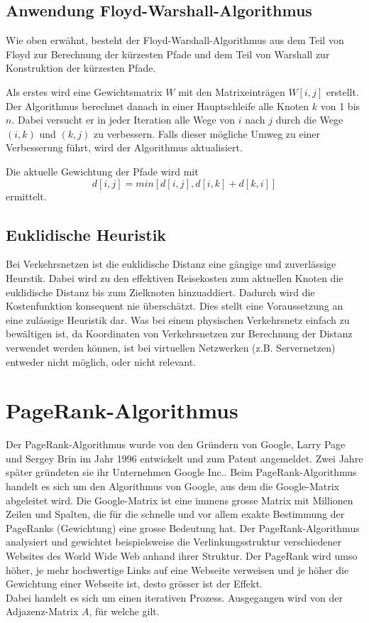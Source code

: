 \subsection{Anwendung Floyd-Warshall-Algorithmus}

Wie oben erwähnt, besteht der Floyd-Warshall-Algorithmus aus dem Teil von Floyd zur Berechnung der kürzesten Pfade und dem Teil von Warshall zur Konstruktion der kürzesten Pfade.

Als erstes wird eine Gewichtsmatrix $W$ mit den Matrixeinträgen $W[i, j]$ erstellt.
Der Algorithmus berechnet danach in einer Hauptschleife alle Knoten $k$ von 1 bis $n$.
Dabei versucht er in jeder Iteration alle Wege von $i$ nach $j$ durch die Wege $(i, k)$ und $(k, j)$ zu verbessern.
Falls dieser mögliche Umweg zu einer Verbesserung führt, wird der Algorithmus aktualisiert.

Die aktuelle Gewichtung der Pfade wird mit
\begin{equation}d[i, j]=min[d[i,j], d[i,k] + d[k,i]]\end{equation}
ermittelt.

\subsection{Euklidische Heuristik}
Bei Verkehrsnetzen ist die euklidische Distanz eine gängige und zuverlässige Heurstik. Dabei wird zu den effektiven Reisekosten zum aktuellen Knoten die euklidische Distanz bis zum Zielknoten hinzuaddiert. Dadurch wird die Kostenfunktion konsequent nie überschätzt. Dies stellt eine Voraussetzung an eine zulässige Heuristik dar.
Was bei einem physischen Verkehrsnetz einfach zu bewältigen ist, da Koordinaten von Verkehrsnetzen zur Berechnung der Distanz verwendet werden können, ist bei virtuellen Netzwerken (z.B. Servernetzen) entweder nicht möglich, oder nicht relevant.

\section{PageRank-Algorithmus}
Der PageRank-Algorithmus wurde von den Gründern von Google, Larry Page und Sergey Brin im Jahr 1996 entwickelt und zum Patent angemeldet. Zwei Jahre später gründeten sie ihr Unternehmen Google Inc..
Beim PageRank-Algorithmus handelt es sich um den Algorithmus von Google, aus dem die Google-Matrix abgeleitet wird.
Die Google-Matrix ist eine immens grosse Matrix mit Millionen Zeilen und Spalten, die für die schnelle und vor allem exakte Bestimmung der PageRanks (Gewichtung) eine grosse Bedeutung hat.
Der PageRank-Algorithmus analysiert und gewichtet beispielsweise die Verlinkungsstruktur verschiedener Websites des World Wide Web anhand ihrer Struktur.
Der PageRank wird umso höher, je mehr hochwertige Links auf eine Webseite verweisen und je höher die Gewichtung einer Webseite ist, desto grösser ist der Effekt.\\
Dabei handelt es sich um einen iterativen Prozess. Ausgegangen wird von der Adjazenz-Matrix $A$, für welche gilt.

